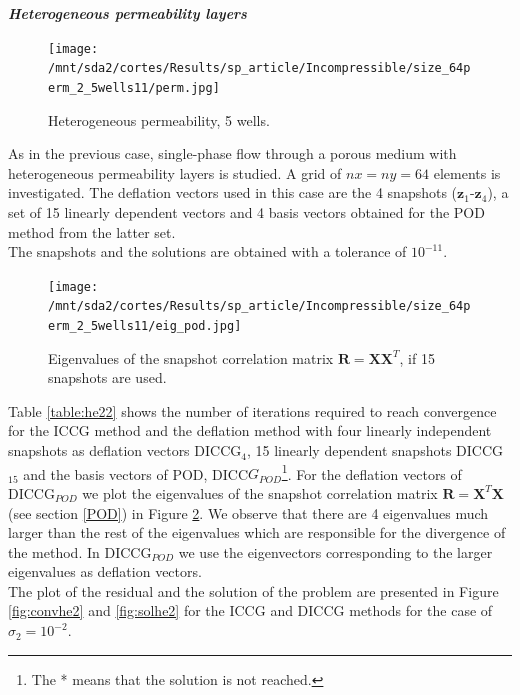\documentclass[12pt]{article}
\begin{document}
\normalsize
\newpage
\emph{\textbf{Heterogeneous permeability layers}}\\

\begin{figure}
\centering 
\vspace{-10pt}
\texttt{[image: /mnt/sda2/cortes/Results/sp\_article/Incompressible/size\_64perm\_2\_5wells11/perm.jpg]}
 \vspace{-25pt}
\caption{ Heterogeneous permeability, 5 wells.}\label{fig:hep_2}
\vspace{-15pt}
\end{figure} 
As in the previous case, single-phase flow through a porous medium with heterogeneous permeability layers is studied.
A grid of $nx = ny = 64$ elements is investigated. The deflation vectors used in this case are the 4 snapshots ($\mathbf{z}_1$-$\mathbf{z}_4$), a set of 15 linearly dependent vectors and 4 basis vectors obtained for the POD method from the latter set.\\
The snapshots and the solutions are obtained with a tolerance of $10^{-11}$. \\

\begin{figure}[H]
 \centering
\texttt{[image: /mnt/sda2/cortes/Results/sp\_article/Incompressible/size\_64perm\_2\_5wells11/eig\_pod.jpg]}
\caption{Eigenvalues of the snapshot correlation matrix $\mathbf{R}=\mathbf{X}\mathbf{X}^T$, if 15 snapshots are used.}
\label{fig:eig}
\end{figure} 
Table \ref{table:he22} shows the number of iterations required to reach convergence for the ICCG method and the deflation method with four linearly independent snapshots as deflation vectors DICCG$_{4}$, 15 linearly dependent snapshots DICCG$_{15}$ and the basis vectors of POD, DICC$G_{POD}$\footnote{The * means that the solution is not reached.}. 
For the deflation vectors of DICCG$_{POD}$ we plot the eigenvalues of the snapshot correlation matrix $\mathbf{R}=\mathbf{X}^T \mathbf{X}$ (see section \ref{POD}) in Figure \ref{fig:eig}. We observe that there are 4 eigenvalues much larger than the rest of the eigenvalues which are responsible for the divergence of the method. In DICCG$_{POD}$ we use the eigenvectors corresponding to the larger eigenvalues as deflation vectors.\\
The plot of the residual and the solution of the problem are presented in
Figure \ref{fig:convhe2} and \ref{fig:solhe2} for the ICCG and DICCG methods for the case of $\sigma_2=10^{-2}$.\\
\end{document}
